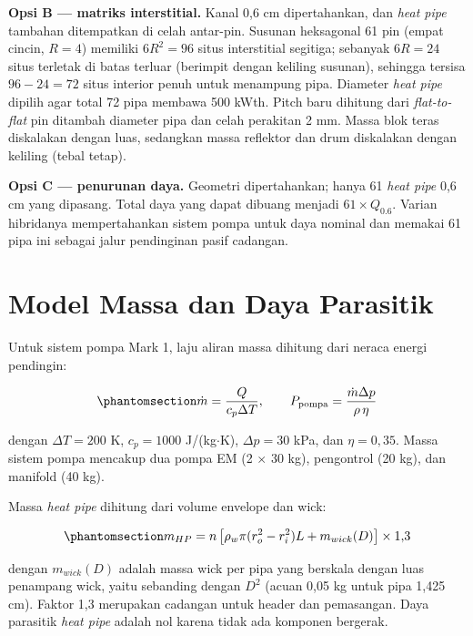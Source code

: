 \documentclass[
  indonesian,
  12pt,
  a4paper,
]{report}
\begin{document}
\textbf{Opsi B --- matriks interstitial.} Kanal 0,6 cm dipertahankan,
dan \emph{heat pipe} tambahan ditempatkan di celah antar-pin. Susunan
heksagonal 61 pin (empat cincin, \(R=4\)) memiliki \(6R^2=96\) situs
interstitial segitiga; sebanyak \(6R=24\) situs terletak di batas
terluar (berimpit dengan keliling susunan), sehingga tersisa
\(96-24=72\) situs interior penuh untuk menampung pipa. Diameter
\emph{heat pipe} dipilih agar total 72 pipa membawa 500 kWth. Pitch baru
dihitung dari \emph{flat-to-flat} pin ditambah diameter pipa dan celah
perakitan 2 mm. Massa blok teras diskalakan dengan luas, sedangkan massa
reflektor dan drum diskalakan dengan keliling (tebal tetap).

\textbf{Opsi C --- penurunan daya.} Geometri dipertahankan; hanya 61
\emph{heat pipe} 0,6 cm yang dipasang. Total daya yang dapat dibuang
menjadi \(61\times Q_{0.6}\). Varian hibridanya mempertahankan sistem
pompa untuk daya nominal dan memakai 61 pipa ini sebagai jalur
pendinginan pasif cadangan.

\section{Model Massa dan Daya
Parasitik}\label{model-massa-dan-daya-parasitik}

Untuk sistem pompa Mark 1, laju aliran massa dihitung dari neraca energi
pendingin:

\begin{equation}\protect\phantomsection\label{eq-pump}{ \dot{m} = \frac{Q}{c_{p}\Delta T}, \qquad
   P_{\mathrm{pompa}} = \frac{\dot{m}\Delta p}{\rho\,\eta}
   }\end{equation}

dengan \(\Delta T=200\) K, \(c_p=1000\) J/(kg\(\cdot\)K),
\(\Delta p=30\) kPa, dan \(\eta=0{,}35\). Massa sistem pompa mencakup
dua pompa EM (2 \(\times\) 30 kg), pengontrol (20 kg), dan manifold (40
kg).

Massa \emph{heat pipe} dihitung dari volume envelope dan wick:

\begin{equation}\protect\phantomsection\label{eq-hpmass}{ m_{HP} = n\left[\rho_w\pi(r_o^2-r_i^2)L + m_{wick}(D)\right]\times1{,}3
   }\end{equation}

dengan \(m_{wick}(D)\) adalah massa wick per pipa yang berskala dengan
luas penampang wick, yaitu sebanding dengan \(D^2\) (acuan 0,05 kg untuk
pipa 1,425 cm). Faktor 1,3 merupakan cadangan untuk header dan
pemasangan. Daya parasitik \emph{heat pipe} adalah nol karena tidak ada
komponen bergerak.
\end{document}
